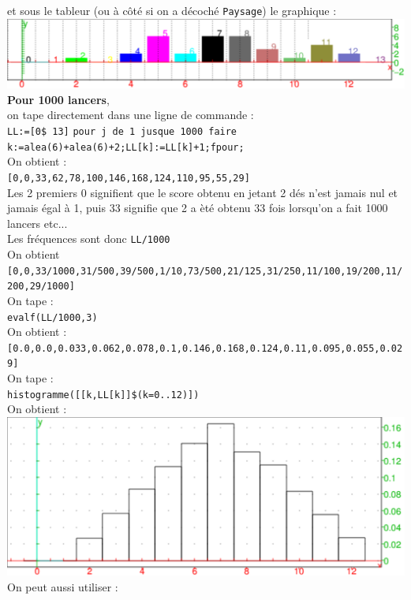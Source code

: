 \documentclass[a4paper,11pt]{book}
\begin{document}
et  sous le tableur (ou \`a c\^ot\'e si on a d\'ecoch\'e 
{\tt Paysage}) le graphique :\\
\includegraphics[width=\textwidth]{trisbatab}\\
{\bf Pour 1000 lancers},\\
 on tape directement dans une ligne de commande :\\
{\tt LL:=[0\$ 13]}
{\tt pour j de 1 jusque 1000 faire k:=alea(6)+alea(6)+2;LL[k]:=LL[k]+1;fpour;}\\ 
On obtient :\\ 
{\tt [0,0,33,62,78,100,146,168,124,110,95,55,29]}\\
Les 2 premiers 0 signifient que le score obtenu en jetant 2 d\'es n'est jamais 
nul et jamais \'egal \`a 1, puis 33 signifie que 2 a \`et\'e obtenu 33 fois 
lorsqu'on a fait 1000 lancers etc...\\
Les fr\'equences sont donc {\tt LL/1000}\\
On obtient \\
{\tt [0,0,33/1000,31/500,39/500,1/10,73/500,21/125,31/250,11/100,19/200,11/200,29/1000]}\\
On tape :\\
{\tt evalf(LL/1000,3)}\\
On obtient :\\
{\tt [0.0,0.0,0.033,0.062,0.078,0.1,0.146,0.168,0.124,0.11,0.095,0.055,0.029]}\\
On tape :\\
{\tt histogramme([[k,LL[k]]\$(k=0..12)])}\\
On obtient :\\ 
\includegraphics[width=\textwidth]{troishist1}\\
On peut aussi utiliser :\\
\end{document}
